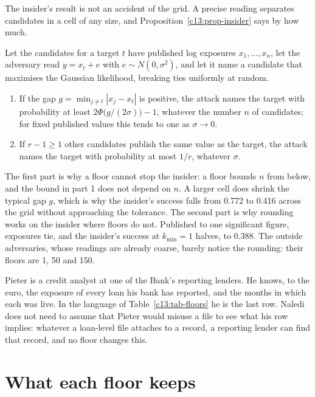 The insider's result is not an accident of the grid. A precise reading separates
candidates in a cell of any size, and Proposition~\ref{c13:prop-insider} says by how
much.

\begin{proposition}\label{c13:prop-insider}
Let the candidates for a target $t$ have published log exposures $x_1,\dots,x_n$, let
the adversary read $y = x_t + e$ with $e \sim N(0,\sigma^2)$, and let it name a
candidate that maximises the Gaussian likelihood, breaking ties uniformly at random.
\begin{enumerate}
\item If the gap $g = \min_{j \ne t} |x_j - x_t|$ is positive, the attack names the
target with probability at least $2\Phi\bigl(g/(2\sigma)\bigr) - 1$, whatever the number $n$ of
candidates; for fixed published values this tends to one as $\sigma \to 0$.
\item If $r - 1 \ge 1$ other candidates publish the same value as the target, the
attack names the target with probability at most $1/r$, whatever $\sigma$.
\end{enumerate}
\end{proposition}

The first part is why a floor cannot stop the insider: a floor bounds $n$ from below,
and the bound in part 1 does not depend on $n$. A larger cell does shrink the typical
gap $g$, which is why the insider's success falls from 0.772 to 0.416 across the grid
without approaching the tolerance. The second part is why rounding works on the
insider where floors do not. Published to one significant figure, exposures tie, and
the insider's success at $k_{\min}=1$ halves, to 0.388. The outside adversaries,
whose readings are already coarse, barely notice the rounding: their floors are 1,
50 and 150.

Pieter is a credit analyst at one of the Bank's reporting lenders. He knows, to the
euro, the exposure of every loan his bank has reported, and the months in which each
was live. In the language of Table~\ref{c13:tab-floors} he is the last row. Naledi
does not need to assume that Pieter would misuse a file to see what his row implies:
whatever a loan-level file attaches to a record, a reporting lender can find that
record, and no floor changes this.

\section{What each floor keeps}\label{c13:sec-keeps}

